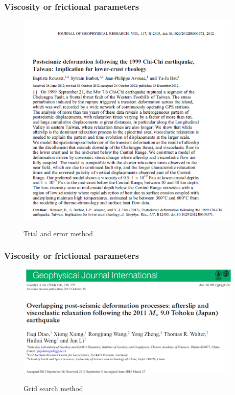 ﻿\documentclass{beamer}
\begin{document}
\begin{frame}
\frametitle{Viscosity or frictional parameters}
\begin{figure}
  \centering
  \includegraphics[scale=0.4]{./pic/trial.png}\\
  \caption{Trial and error method}\label{fig_okada}
\end{figure}

\end{frame}

\begin{frame}
\frametitle{Viscosity or frictional parameters}
\begin{figure}
  \centering
  \includegraphics[scale=0.4]{./pic/grid.png}\\
  \caption{Grid search method}\label{fig_okada}
\end{figure}

\end{frame}
\end{document}

